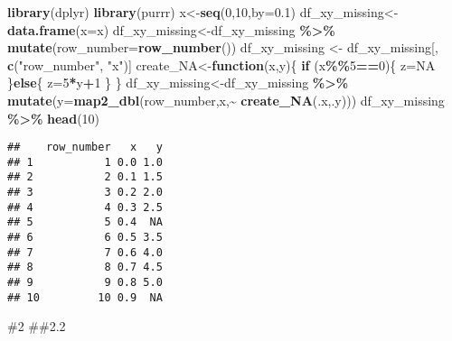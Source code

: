 \documentclass[
]{article}
\newenvironment{Shaded}{\begin{snugshade}}{\end{snugshade}}
\newcommand{\AttributeTok}[1]{\textcolor[rgb]{0.13,0.29,0.53}{#1}}
\newcommand{\ConstantTok}[1]{\textcolor[rgb]{0.56,0.35,0.01}{#1}}
\newcommand{\ControlFlowTok}[1]{\textcolor[rgb]{0.13,0.29,0.53}{\textbf{#1}}}
\newcommand{\DecValTok}[1]{\textcolor[rgb]{0.00,0.00,0.81}{#1}}
\newcommand{\FloatTok}[1]{\textcolor[rgb]{0.00,0.00,0.81}{#1}}
\newcommand{\FunctionTok}[1]{\textcolor[rgb]{0.13,0.29,0.53}{\textbf{#1}}}
\newcommand{\NormalTok}[1]{#1}
\newcommand{\OtherTok}[1]{\textcolor[rgb]{0.56,0.35,0.01}{#1}}
\newcommand{\SpecialCharTok}[1]{\textcolor[rgb]{0.81,0.36,0.00}{\textbf{#1}}}
\newcommand{\StringTok}[1]{\textcolor[rgb]{0.31,0.60,0.02}{#1}}
\begin{document}
\begin{Shaded}
\begin{Highlighting}[]
\FunctionTok{library}\NormalTok{(dplyr)}
\FunctionTok{library}\NormalTok{(purrr)}
\NormalTok{x}\OtherTok{\textless{}{-}}\FunctionTok{seq}\NormalTok{(}\DecValTok{0}\NormalTok{,}\DecValTok{10}\NormalTok{,}\AttributeTok{by=}\FloatTok{0.1}\NormalTok{)}
\NormalTok{df\_xy\_missing}\OtherTok{\textless{}{-}}\FunctionTok{data.frame}\NormalTok{(}\AttributeTok{x=}\NormalTok{x)}
\NormalTok{df\_xy\_missing}\OtherTok{\textless{}{-}}\NormalTok{df\_xy\_missing }\SpecialCharTok{\%\textgreater{}\%}
  \FunctionTok{mutate}\NormalTok{(}\AttributeTok{row\_number=}\FunctionTok{row\_number}\NormalTok{())}
\NormalTok{df\_xy\_missing }\OtherTok{\textless{}{-}}\NormalTok{ df\_xy\_missing[, }\FunctionTok{c}\NormalTok{(}\StringTok{"row\_number"}\NormalTok{, }\StringTok{"x"}\NormalTok{)]}
\NormalTok{create\_NA}\OtherTok{\textless{}{-}}\ControlFlowTok{function}\NormalTok{(x,y)\{}
  \ControlFlowTok{if}\NormalTok{ (x}\SpecialCharTok{\%\%}\DecValTok{5}\SpecialCharTok{==}\DecValTok{0}\NormalTok{)\{}
\NormalTok{    z}\OtherTok{=}\ConstantTok{NA}
\NormalTok{  \}}\ControlFlowTok{else}\NormalTok{\{}
\NormalTok{    z}\OtherTok{=}\DecValTok{5}\SpecialCharTok{*}\NormalTok{y}\SpecialCharTok{+}\DecValTok{1}
\NormalTok{  \}}
\NormalTok{\}}
\NormalTok{df\_xy\_missing}\OtherTok{\textless{}{-}}\NormalTok{df\_xy\_missing }\SpecialCharTok{\%\textgreater{}\%}
  \FunctionTok{mutate}\NormalTok{(}\AttributeTok{y=}\FunctionTok{map2\_dbl}\NormalTok{(row\_number,x,}\SpecialCharTok{\textasciitilde{}} \FunctionTok{create\_NA}\NormalTok{(.x,.y)))}
\NormalTok{df\_xy\_missing }\SpecialCharTok{\%\textgreater{}\%} \FunctionTok{head}\NormalTok{(}\DecValTok{10}\NormalTok{)}
\end{Highlighting}
\end{Shaded}

\begin{verbatim}
##    row_number   x   y
## 1           1 0.0 1.0
## 2           2 0.1 1.5
## 3           3 0.2 2.0
## 4           4 0.3 2.5
## 5           5 0.4  NA
## 6           6 0.5 3.5
## 7           7 0.6 4.0
## 8           8 0.7 4.5
## 9           9 0.8 5.0
## 10         10 0.9  NA
\end{verbatim}

\#2 \#\#2.2
\end{document}
